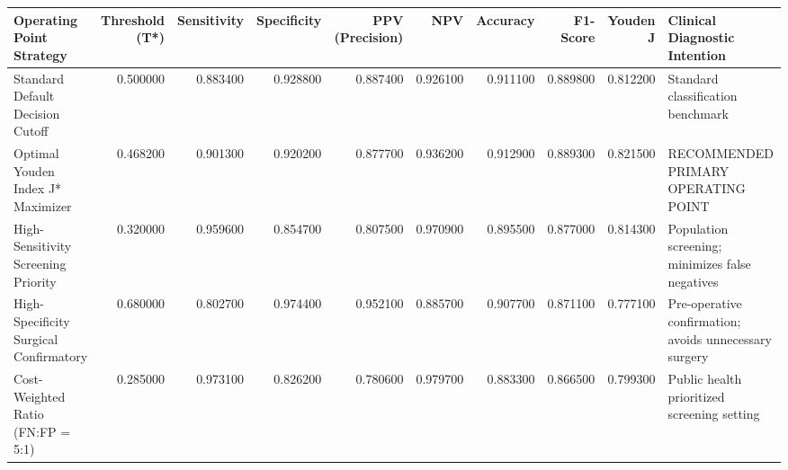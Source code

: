\begin{tabular}{lrrrrrrrrl}
\toprule
Operating Point Strategy & Threshold (T*) & Sensitivity & Specificity & PPV (Precision) & NPV & Accuracy & F1-Score & Youden J & Clinical Diagnostic Intention \\
\midrule
Standard Default Decision Cutoff & 0.500000 & 0.883400 & 0.928800 & 0.887400 & 0.926100 & 0.911100 & 0.889800 & 0.812200 & Standard classification benchmark \\
Optimal Youden Index J* Maximizer & 0.468200 & 0.901300 & 0.920200 & 0.877700 & 0.936200 & 0.912900 & 0.889300 & 0.821500 & RECOMMENDED PRIMARY OPERATING POINT \\
High-Sensitivity Screening Priority & 0.320000 & 0.959600 & 0.854700 & 0.807500 & 0.970900 & 0.895500 & 0.877000 & 0.814300 & Population screening; minimizes false negatives \\
High-Specificity Surgical Confirmatory & 0.680000 & 0.802700 & 0.974400 & 0.952100 & 0.885700 & 0.907700 & 0.871100 & 0.777100 & Pre-operative confirmation; avoids unnecessary surgery \\
Cost-Weighted Ratio (FN:FP = 5:1) & 0.285000 & 0.973100 & 0.826200 & 0.780600 & 0.979700 & 0.883300 & 0.866500 & 0.799300 & Public health prioritized screening setting \\
\bottomrule
\end{tabular}
